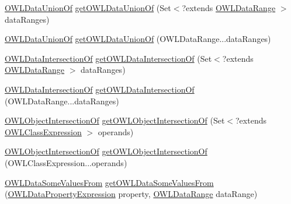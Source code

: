 \begin{DoxyCompactItemize}
\item 
\hyperlink{interfaceorg_1_1semanticweb_1_1owlapi_1_1model_1_1_o_w_l_data_union_of}{O\-W\-L\-Data\-Union\-Of} \hyperlink{interfaceorg_1_1semanticweb_1_1owlapi_1_1model_1_1_o_w_l_data_factory_a051150f6f96038e907d203b9e25b84cc}{get\-O\-W\-L\-Data\-Union\-Of} (Set$<$?extends \hyperlink{interfaceorg_1_1semanticweb_1_1owlapi_1_1model_1_1_o_w_l_data_range}{O\-W\-L\-Data\-Range} $>$ data\-Ranges)
\item 
\hyperlink{interfaceorg_1_1semanticweb_1_1owlapi_1_1model_1_1_o_w_l_data_union_of}{O\-W\-L\-Data\-Union\-Of} \hyperlink{interfaceorg_1_1semanticweb_1_1owlapi_1_1model_1_1_o_w_l_data_factory_a269dd488d4f2e3b86250d9758195cca3}{get\-O\-W\-L\-Data\-Union\-Of} (O\-W\-L\-Data\-Range...\-data\-Ranges)
\item 
\hyperlink{interfaceorg_1_1semanticweb_1_1owlapi_1_1model_1_1_o_w_l_data_intersection_of}{O\-W\-L\-Data\-Intersection\-Of} \hyperlink{interfaceorg_1_1semanticweb_1_1owlapi_1_1model_1_1_o_w_l_data_factory_a4d5e0679749de0dbef3d58a29bdca92d}{get\-O\-W\-L\-Data\-Intersection\-Of} (Set$<$?extends \hyperlink{interfaceorg_1_1semanticweb_1_1owlapi_1_1model_1_1_o_w_l_data_range}{O\-W\-L\-Data\-Range} $>$ data\-Ranges)
\item 
\hyperlink{interfaceorg_1_1semanticweb_1_1owlapi_1_1model_1_1_o_w_l_data_intersection_of}{O\-W\-L\-Data\-Intersection\-Of} \hyperlink{interfaceorg_1_1semanticweb_1_1owlapi_1_1model_1_1_o_w_l_data_factory_a4bebfb21f8aae97603502e7c0332f826}{get\-O\-W\-L\-Data\-Intersection\-Of} (O\-W\-L\-Data\-Range...\-data\-Ranges)
\item 
\hyperlink{interfaceorg_1_1semanticweb_1_1owlapi_1_1model_1_1_o_w_l_object_intersection_of}{O\-W\-L\-Object\-Intersection\-Of} \hyperlink{interfaceorg_1_1semanticweb_1_1owlapi_1_1model_1_1_o_w_l_data_factory_a3458e51f85ed2724e2b58f936218ca04}{get\-O\-W\-L\-Object\-Intersection\-Of} (Set$<$?extends \hyperlink{interfaceorg_1_1semanticweb_1_1owlapi_1_1model_1_1_o_w_l_class_expression}{O\-W\-L\-Class\-Expression} $>$ operands)
\item 
\hyperlink{interfaceorg_1_1semanticweb_1_1owlapi_1_1model_1_1_o_w_l_object_intersection_of}{O\-W\-L\-Object\-Intersection\-Of} \hyperlink{interfaceorg_1_1semanticweb_1_1owlapi_1_1model_1_1_o_w_l_data_factory_a7f714c33a9e0b874e5c77d1e77d3f6d4}{get\-O\-W\-L\-Object\-Intersection\-Of} (O\-W\-L\-Class\-Expression...\-operands)
\item 
\hyperlink{interfaceorg_1_1semanticweb_1_1owlapi_1_1model_1_1_o_w_l_data_some_values_from}{O\-W\-L\-Data\-Some\-Values\-From} \hyperlink{interfaceorg_1_1semanticweb_1_1owlapi_1_1model_1_1_o_w_l_data_factory_a10609899eb336ee53ae5828780f83fde}{get\-O\-W\-L\-Data\-Some\-Values\-From} (\hyperlink{interfaceorg_1_1semanticweb_1_1owlapi_1_1model_1_1_o_w_l_data_property_expression}{O\-W\-L\-Data\-Property\-Expression} property, \hyperlink{interfaceorg_1_1semanticweb_1_1owlapi_1_1model_1_1_o_w_l_data_range}{O\-W\-L\-Data\-Range} data\-Range)

\end{DoxyCompactItemize}
